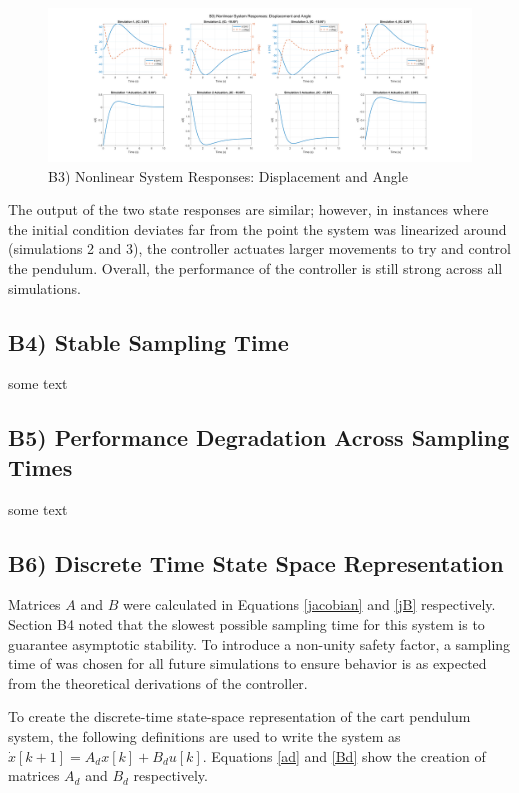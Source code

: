 \documentclass{article}
\begin{document}
\begin{figure}[H]
    \centering
    \includegraphics[width=\textwidth]{figures/b3_x.png}
    \caption{B3) Nonlinear System Responses: Displacement and Angle}
    \label{B3}
\end{figure}

The output of the two state responses are similar; however, in instances where the initial condition deviates far from the point the system was linearized around (simulations 2 and 3), the controller actuates larger movements to try and control the pendulum. Overall, the performance of the controller is still strong across all simulations.

\subsection*{B4) Stable Sampling Time}

some text

\subsection*{B5) Performance Degradation Across Sampling Times}

some text

\subsection*{B6) Discrete Time State Space Representation}
Matrices $A$ and $B$ were calculated in Equations \ref{jacobian} and \ref{jB} respectively. Section B4 noted that the slowest possible sampling time for this system is to guarantee asymptotic stability. To introduce a non-unity safety factor, a sampling time of  was chosen for all future simulations to ensure behavior is as expected from the theoretical derivations of the controller.

To create the discrete-time state-space representation of the cart pendulum system, the following definitions are used to write the system as $\dot x[k+1]=A_dx[k]+B_du[k]$. Equations \ref{ad} and \ref{Bd} show the creation of matrices $A_d$ and $B_d$ respectively.
\end{document}
